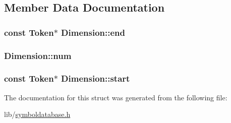 \subsection{Member Data Documentation}
\hypertarget{struct_dimension_a668febd4ff9411d3e510d76a453e4569}{
\subsubsection[{end}]{\setlength{\rightskip}{0pt plus 5cm}const {\bf Token}$\ast$ Dimension\-::end}}\label{struct_dimension_a668febd4ff9411d3e510d76a453e4569}
\hypertarget{struct_dimension_a41bcac710755a95e9da9cf7b1ca83e24}{
\subsubsection[{num}]{ Dimension\-::num}}\label{struct_dimension_a41bcac710755a95e9da9cf7b1ca83e24}
\hypertarget{struct_dimension_a5db717b980a04770dddbb6dd93f4dc3c}{
\subsubsection[{start}]{\setlength{\rightskip}{0pt plus 5cm}const {\bf Token}$\ast$ Dimension\-::start}}\label{struct_dimension_a5db717b980a04770dddbb6dd93f4dc3c}


The documentation for this struct was generated from the following file\-:\begin{DoxyCompactItemize}
\item 
lib/\hyperlink{symboldatabase_8h}{symboldatabase.\-h}\end{DoxyCompactItemize}

